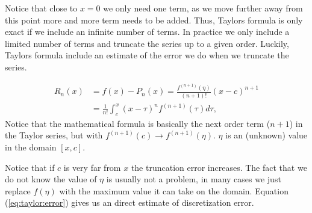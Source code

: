 \documentclass[graybox,sectrefs,envcountresetchap,open=right,final]{svmonodo}
\newenvironment{graybox2admon}[1][]{
\begin{graybox2mdframed}[frametitle=#1]
}
{
\end{graybox2mdframed}
}
\begin{document}
Notice that close to $x=0$ we only need one term, as we move further away from this point more and more term needs to be added. Thus, Taylors formula is only exact if we include an infinite number of terms. In practice we only include a limited number of terms and truncate the series up to a given order. Luckily, Taylors formula include an estimate of the error we do when we truncate the series. 


\begin{graybox2admon}[Truncation error in Taylors formula:]
\begin{align}
R_n(x)&=f(x)-P_n(x)=\frac{f^{(n+1)}(\eta)}{(n+1)!}(x-c)^{n+1}\nonumber\\ 
      &=\frac{1}{n!}\int_c^x(x-\tau)^{n}f^{(n+1)}(\tau)d\tau,\label{eq:taylor:error}
\end{align}
Notice that the mathematical formula is basically the next order term ($n+1$) in the Taylor series, but with $f^{(n+1)}(c)\to f^{(n+1)}(\eta)$. $\eta$ is an (unknown) value in the domain $[x,c]$.
\end{graybox2admon}



Notice that if $c$ is very far from $x$ the truncation error increases. The fact that we do not know the value of $\eta$ is usually not a problem, in many cases we just replace $f(\eta)$ with the maximum value it can take on the domain. Equation (\ref{eq:taylor:error}) gives us an direct estimate of discretization error. 
\end{document}
